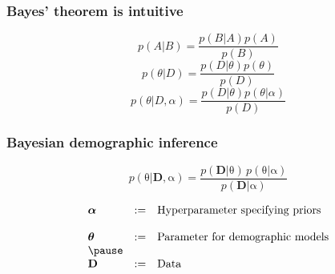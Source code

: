 \documentclass{beamer}
\newcommand{\greekbf}[1]{\boldsymbol{\mathrm{#1}}}
\begin{document}
\begin{frame}[t]
  \frametitle{Bayes' theorem is intuitive}
  \begin{minipage}{0\linewidth}
\begin{flushleft}
\begin{equation*}
  p(A|B) = \frac{p(B|A) p(A)}{p(B)}
\end{equation*}
\pause
\begin{equation*}
  p(\theta|D) = \frac{p(D|\theta) p(\theta)}{p(D)}
\end{equation*}
\pause
\begin{equation*}
  p(\theta|D,\alpha) = \frac{p(D|\theta) p(\theta|\alpha)}{p(D)}
\end{equation*}

\end{flushleft} 
\end{minipage}
\end{frame}

\begin{frame}
  \frametitle{Bayesian demographic inference}
  \begin{center}
	\begin{equation*}
          p(\greekbf{\theta}|\mathbf{D},\greekbf{\alpha}) = \frac{p(\mathbf{D}|\greekbf{\theta}) \, p(\greekbf{\theta}|\greekbf{\alpha})}{p(\mathbf{D}|\greekbf{\alpha})}
        \end{equation*}
  \end{center}

  \pause
  \begin{center}
          \begin{equation*}
            \begin{array}{lll}
	      \greekbf{\alpha} & := & \mbox{Hyperparameter specifying priors}\\
                               &    &\\
              \greekbf{\theta} & := & \mbox{Parameter for demographic models}\\
	      \pause
                               &    &\\
              \mathbf{D}       & := & \mbox{Data}\\
                               &    &\\
            \end{array}
          \end{equation*}
  \end{center}
\end{frame}
\end{document}

